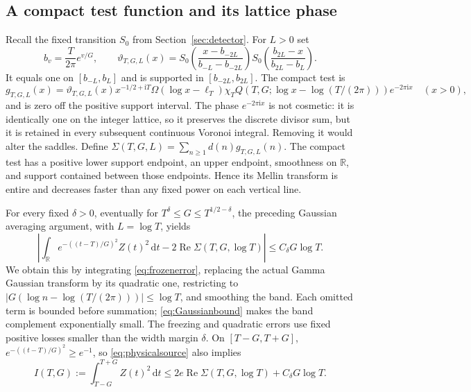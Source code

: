 \documentclass[11pt,a4paper]{article}
\numberwithin{equation}{section}
\theoremstyle{definition}
\newcommand{\R}{\mathbb R}
\newcommand{\dd}{\,\mathrm d}
\newcommand{\ii}{\mathrm i}
\newcommand{\Rea}{\operatorname{Re}}
\newcommand{\zabs}{Z}
\begin{document}
\subsection{A compact test function and its lattice phase}
Recall the fixed transition $S_0$ from Section~\ref{sec:detector}.
For $L>0$ set
\[
 b_v=\frac{T}{2\pi}e^{v/G},\qquad
 \vartheta_{T,G,L}(x)=S_0\!\left(\frac{x-b_{-2L}}{b_{-L}-b_{-2L}}\right)
 S_0\!\left(\frac{b_{2L}-x}{b_{2L}-b_L}\right).
\]
It equals one on $[b_{-L},b_L]$ and is supported in $[b_{-2L},b_{2L}]$.
The compact test is
\begin{equation}\label{eq:compacttest}
 g_{T,G,L}(x)=\vartheta_{T,G,L}(x)x^{-1/2+\ii T}
 \Omega(\log x-\ell_T)\chi_TQ(T,G;\log x-\log(T/(2\pi)))e^{-2\pi\ii x}
 \quad(x>0),
\end{equation}
and is zero off the positive support interval. The phase $e^{-2\pi\ii x}$
is not cosmetic: it is identically one on the integer lattice, so it preserves
the discrete divisor sum, but it is retained in every subsequent continuous
Voronoi integral. Removing it would alter the saddles.
Define $\Sigma(T,G,L)=\sum_{n\ge1}d(n)g_{T,G,L}(n)$.
The compact test has a positive lower support endpoint, an upper endpoint,
smoothness on $\R$, and support contained between those endpoints.
Hence its Mellin transform is
entire and decreases faster than any fixed power on each vertical line.

For every fixed $\delta>0$, eventually for
$T^\delta\le G\le T^{1/2-\delta}$, the preceding Gaussian averaging argument,
with $L=\log T$, yields
\begin{equation}\label{eq:physicalsource}
 \left|\int_{\R}e^{-((t-T)/G)^2}\zabs(t)^2\dd t
                  -2\Rea\Sigma(T,G,\log T)\right|\le C_\delta G\log T.
\end{equation}
We obtain this by integrating \eqref{eq:frozenerror}, replacing the
actual Gamma Gaussian transform by its quadratic one, restricting to
$|G(\log n-\log(T/(2\pi)))|\le\log T$, and smoothing the band. Each omitted
term is bounded before summation; \eqref{eq:Gaussianbound} makes the band
complement exponentially small. The freezing and quadratic errors use fixed
positive losses smaller than the width margin $\delta$.
On $[T-G,T+G]$, $e^{-((t-T)/G)^2}\ge e^{-1}$, so
\eqref{eq:physicalsource} also implies
\begin{equation}\label{eq:localsource}
 I(T,G):=\int_{T-G}^{T+G}\zabs(t)^2\dd t
          \le2e\Rea\Sigma(T,G,\log T)+C_\delta G\log T.
\end{equation}
\end{document}

